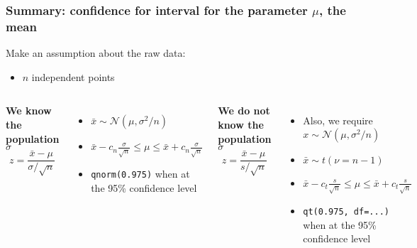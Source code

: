 \begin{frame}\frametitle{Summary: confidence for interval for the parameter $\mu$, the mean}
	Make an assumption about the raw data:
	\begin{itemize}
		\item	$n$ independent points \qquad {\color{myOrange}{$\longleftarrow$ this assumption is always required}}
	\end{itemize}
	
	\vspace{12pt}
	

	\begin{columns}[t]
			\textbf{We know the population $\sigma$}
			\[
			 	z = \dfrac{\bar{x} - \mu}{\sigma/\sqrt{n}}
			 \]			
			 
			 \vspace{20pt}

			\begin{itemize}
				\item	$\bar{x} \sim \mathcal{N}(\mu, \sigma^2/n)$
								
				\vspace{12pt}
				\item	$\displaystyle \bar{x} - c_n\frac{\sigma}{\sqrt{n}} \leq \mu \leq \bar{x} + c_n\frac{\sigma}{\sqrt{n}}$
				
				\vspace{12pt}
				\item	\texttt{qnorm(0.975)} when at the 95\% confidence level
			\end{itemize}
			\textbf{We do not know the population $\sigma$}
			\[
				 z = \dfrac{\bar{x} - \mu}{s/\sqrt{n}}
			\]
			\begin{itemize}
				\item	{\color{myGreen}Also, we require $x \sim \mathcal{N}(\mu, \sigma^2/n)$}
				\item	$\bar{x} \sim t(\nu = n-1)$
				
				\vspace{12pt}
				\item	$\displaystyle \bar{x} - c_t\frac{s}{\sqrt{n}} \leq \mu \leq \bar{x} + c_t\frac{s}{\sqrt{n}}$
				
				\vspace{12pt}
				
				\item	\texttt{qt(0.975, df=...)} when at the 95\% confidence level
			\end{itemize}
	\end{columns}
\end{frame}

